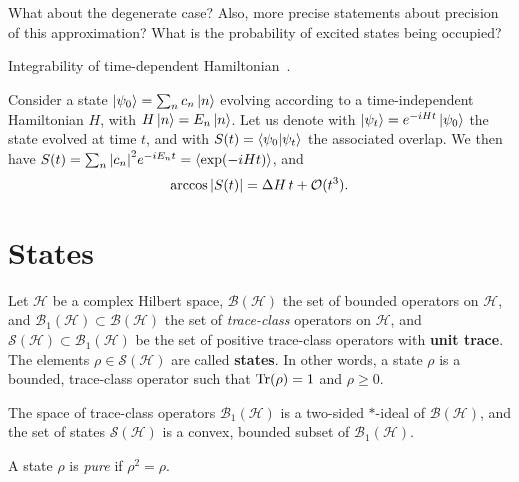 \documentclass[12pt]{report}
\newcommand{\calB}{{\mathcal{B}}}
\newcommand{\calH}{{\mathcal{H}}}
\newcommand{\calS}{{\mathcal{S}}}
\begin{document}
\begin{question}
	What about the degenerate case? Also, more precise statements about precision of this approximation? What is the probability of excited states being occupied?
\end{question}

Integrability of time-dependent Hamiltonian~\autocite{sinitsyn2018integrable}.

\begin{prop}
	Consider a state $\ket{\psi_0}=\sum_n c_n \ket n$ evolving according to a time-independent Hamiltonian $H$, with $H\ket n=E_n \ket n$. Let us denote with $\ket{\psi_t}=e^{-iHt}\ket{\psi_0}$ the state evolved at time $t$, and with $S(t)=\braket{\psi_0}{\psi_t}$ the associated overlap.
	We then have $S(t)=\sum_n \abs{c_n}^2 e^{-iE_n t}=\expval{\exp(-iHt)}$, and
	\begin{equation}
		\arccos\abs{S(t)} = \Delta H\, t + \mathcal O(t^3).
	\end{equation}
\end{prop}

\chapter{States}

\begin{defn}[State]
	Let $\calH$ be a complex Hilbert space, $\calB(\calH)$ the set of bounded operators on $\calH$,
	and $\calB_1(\calH)\subset\calB(\calH)$ the set of \emph{trace-class} operators on $\calH$,
	and $\calS(\calH)\subset\calB_1(\calH)$ be the set of positive trace-class operators with \textbf{unit trace}.
	The elements $\rho\in\calS(\calH)$ are called \textbf{states}.
	In other words, a state $\rho$ is a bounded, trace-class operator such that
	$\Tr(\rho)=1$ and $\rho\ge0$.
\end{defn}

\begin{prop}
	The space of trace-class operators $\calB_1(\calH)$ is a two-sided $*$-ideal of $\calB(\calH)$, and the set of states $\calS(\calH)$ is a convex, bounded subset of $\calB_1(\calH)$.
\end{prop}

\begin{defn}
	A state $\rho$ is \emph{pure} if $\rho^2=\rho$.
\end{defn}
\end{document}
